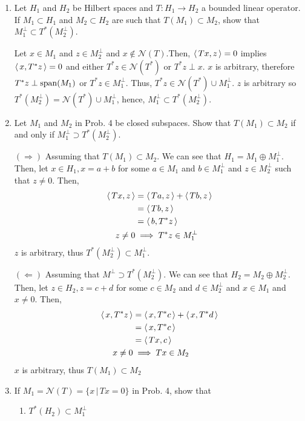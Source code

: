 \documentclass[10pt,a4paper]{report}
\begin{document}
\begin{enumerate}
	\item Let $H_1$ and $H_2$ be Hilbert spaces and $T: H_1 \to H_2$ a bounded linear operator.  If $M_1\subset H_1$ and $M_2 \subset H_2$ are such that $T(M_1) \subset M_2$, show that $M_1^\perp \subset T^*(M_2^\perp)$.
	
	 Let $x \in M_1$ and $z \in M_2^\perp$ and $x \not \in \mathcal{N}(T)$.Then, $\left \langle\, Tx, z \,\right \rangle=0$ implies $\left \langle\, x, T^*z \,\right \rangle=0$ and either $T^*z \in \mathcal{N}(T^*)$ or $T^*z \perp x$.  $x$ is arbitrary, therefore $T^*z \perp \operatorname{span}(M_1)$ or $T^*z \in M_1^\perp$.  Thus, $T^*z \in \mathcal{N}(T^*) \cup M_1^\perp$.  $z$ is arbitrary so $T^*(M_2^\perp) = \mathcal{N}(T^*) \cup M_1^\perp$, hence, $M_1^\perp \subset T^*(M_2^\perp)$.
	
	\item Let $M_1$ and $M_2$ in Prob. 4 be closed subspaces.   Show that $T(M_1)\subset M_2$ if and only if $M_1^\perp \supset T^*(M_2^\perp)$.
	
	$(\Rightarrow)$ Assuming that $T(M_1) \subset M_2$.  We can see that $H_1 = M_1 \oplus M_1^\perp$.  Then, let $x \in H_1, x= a+b$ for some $a \in M_1$ and $b \in M_1^\perp$ and $z \in M_2^\perp$ such that $z \ne 0$.  Then, 
	\begin{align*}
		\left \langle\, Tx, z \,\right \rangle &= \left \langle\, Ta,z \,\right \rangle+\left \langle\, Tb,z \,\right \rangle \\
		&= \left \langle\, Tb,z \,\right \rangle \\
		&= \left \langle\, b, T^*z \,\right \rangle \\
		z \ne 0 &\implies T^*z \in M_1^\perp
	\end{align*}$z$ is arbitrary, thus $T^*(M_2^\perp) \subset M_1^\perp$.
	
	$(\Leftarrow)$ Assuming that $M^\perp \supset T^*(M_2^\perp)$.  We can see that $H_2 = M_2 \oplus M_2^\perp$.  Then, let $z \in H_2, z= c+d$ for some $c\in M_2$ and $d\in M_2^\perp$ and $x \in M_1$ and $x\ne 0$.  Then,
	\begin{align*}
		\left \langle\, x, T^*z \,\right \rangle &= \left \langle\, x, T^*c \,\right \rangle+\left \langle\, x, T^*d \,\right \rangle \\
		&= \left \langle\, x,T^*c \,\right \rangle \\
		&= \left \langle\, Tx, c \,\right \rangle \\
		x \ne 0 & \implies Tx \in M_2
	\end{align*}$x$ is arbitrary, thus $T(M_1) \subset M_2$
	
	\item If $M_1=\mathcal{N}(T)=\{x\,|\,Tx=0\}$ in Prob. 4, show that 
	\begin{enumerate}
		\item $T^*(H_2) \subset M_1^\perp$
		

\end{enumerate}
\end{enumerate}
\end{document}
